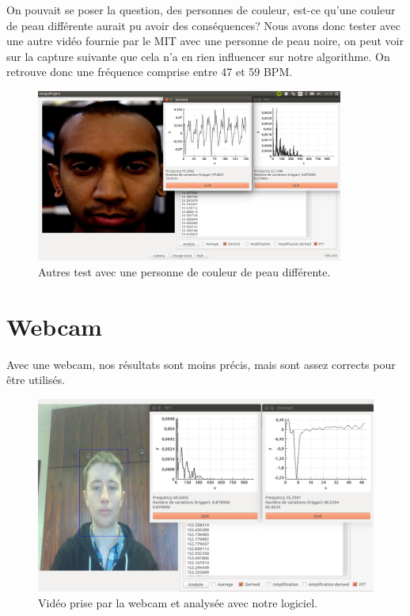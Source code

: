On pouvait se poser la question, des personnes de couleur, est-ce qu'une couleur de peau différente aurait pu avoir des conséquences? Nous avons
donc tester avec une autre vidéo fournie par le MIT avec une personne de peau noire, on peut voir sur la capture suivante que cela n'a en rien influencer
sur notre algorithme. On retrouve donc une fréquence comprise entre 47 et 59 BPM\@.

\begin{figure}[h!]
	\centering
	\includegraphics[width=0.9\textwidth]{data/logi.png}
	\caption{Autres test avec une personne de couleur de peau différente.}
\end{figure}


\section{Webcam}

Avec une webcam, nos résultats sont moins précis, mais sont assez corrects pour être utilisés.

\begin{figure}[h!]
	\centering
	\includegraphics[width=1\textwidth]{data/webcam.png}
	\caption{Vidéo prise par la webcam et analysée avec notre logiciel.}
\end{figure}

